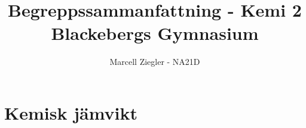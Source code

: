 \documentclass[12pt]{article}
\title{Begreppssammanfattning - Kemi 2 \\ Blackebergs Gymnasium}
\author{Marcell Ziegler - NA21D}
\begin{document}
    \begin{titlepage}
        \maketitle
    \end{titlepage}

    \tableofcontents

    \newpage

    \part{Kemisk jämvikt}
    
    
\end{document}
